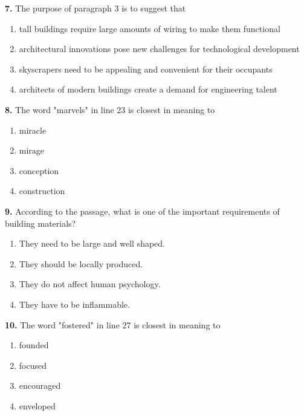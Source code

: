 \documentclass[12pt]{article}
\begin{document}
\par
\vspace{0.25\baselineskip}
\noindent\textbf{7.} The purpose of paragraph 3 is to suggest that
\begin{enumerate}[label=(\Alph*),leftmargin=*,itemsep=0.2em]
\item tall buildings require large amounts of wiring to make them functional
\item architectural innovations pose new challenges for technological development
\item skyscrapers need to be appealing and convenient for their occupants
\item architects of modern buildings create a demand for engineering talent
\end{enumerate}
\par
\vspace{0.25\baselineskip}
\noindent\textbf{8.} The word "marvels" in line 23 is closest in meaning to
\begin{enumerate}[label=(\Alph*),leftmargin=*,itemsep=0.2em]
\item miracle
\item mirage
\item conception
\item construction
\end{enumerate}
\par
\vspace{0.25\baselineskip}
\noindent\textbf{9.} According to the passage, what is one of the important requirements of building materials?
\begin{enumerate}[label=(\Alph*),leftmargin=*,itemsep=0.2em]
\item They need to be large and well shaped.
\item They should be locally produced.
\item They do not affect human psychology.
\item They have to be inflammable.
\end{enumerate}
\par
\vspace{0.25\baselineskip}
\noindent\textbf{10.} The word "fostered" in line 27 is closest in meaning to
\begin{enumerate}[label=(\Alph*),leftmargin=*,itemsep=0.2em]
\item founded
\item focused
\item encouraged
\item enveloped
\end{enumerate}
\end{document}
